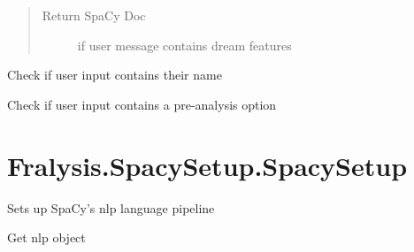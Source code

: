 \documentclass[letterpaper,10pt,english]{sphinxmanual}
\begin{document}
\begin{fulllineitems}
\begin{fulllineitems}
\begin{quote}
\begin{description}
\item[{Return SpaCy Doc}] \leavevmode
if user message contains dream features

\end{description}\end{quote}

\end{fulllineitems}


\begin{fulllineitems}
Check if user input contains their name

\end{fulllineitems}


\begin{fulllineitems}
Check if user input contains a pre-analysis option

\end{fulllineitems}


\end{fulllineitems}



\chapter{Fralysis.SpacySetup.SpacySetup}
\label{\detokenize{index:fralysis-spacysetup-spacysetup}}

\begin{fulllineitems}
\label{\detokenize{index:Fralysis.SpacySetup.SpacySetup}}
Sets up SpaCy’s nlp language pipeline

\begin{fulllineitems}
\label{\detokenize{index:Fralysis.SpacySetup.SpacySetup.get_nlp}}
Get nlp object

\end{fulllineitems}


\end{fulllineitems}
\end{document}
